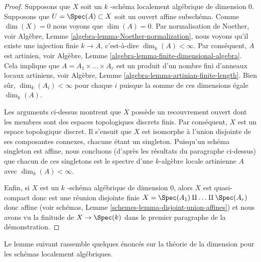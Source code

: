 \begin{proof}
Supposons que $X$ soit un $k$ -schéma localement algébrique
de dimension $0$. Supposons que $U = \Spec(A) \subset X$
soit un ouvert affine subschéma. Comme $\dim(X) = 0$ nous
voyons que $\dim(A) = 0$. Par normalisation de Noether,
voir Algèbre, Lemme
\ref{algebra-lemma-Noether-normalization}, nous voyons qu'il
existe une injection finie $k \to A$, c'est-à-dire $\dim_k(A) <
\infty$. Par conséquent, $A$ est artinien, voir Algèbre, Lemme
\ref{algebra-lemma-finite-dimensional-algebra}. Cela implique que
$A = A_1 \times \ldots \times A_r$ est un produit d'un nombre
fini d'anneaux locaux artiniens, voir Algèbre, Lemme
\ref{algebra-lemma-artinian-finite-length}. Bien sûr, $\dim_k(A_i) <
\infty$ pour chaque $i$ puisque la somme de ces dimensions égale $\dim_k(A)$.

\medskip\noindent
Les arguments ci-dessus montrent que $X$ possède un recouvrement ouvert
dont les membres sont des espaces topologiques discrets finis. Par
conséquent, $X$ est un espace topologique discret. Il s'ensuit que $X$ est
isomorphe à l'union disjointe de ses composantes connexes, chacune étant un
singleton. Puisqu'un schéma singleton est affine, nous concluons (d'après
les résultats du paragraphe ci-dessus) que chacun de ces singletons est le
spectre d'une $k$-algèbre locale artinienne $A$ avec $\dim_k(A) < \infty$.

\medskip\noindent
Enfin, si $X$ est un $k$ -schéma algébrique de
dimension $0$, alors $X$ est quasi-compact donc
est une réunion disjointe finie $X = \Spec(A_1)
\amalg \ldots \amalg \Spec(A_r)$ donc affine (voir
schémas, Lemme
\ref{schemes-lemma-disjoint-union-affines}) et nous avons vu la
finitude de $X \to \Spec(k)$ dans le premier paragraphe de la démonstration.
\end{proof}

\noindent
Le lemme suivant rassemble quelques énoncés sur la théorie
de la dimension pour les schémas localement algébriques.

